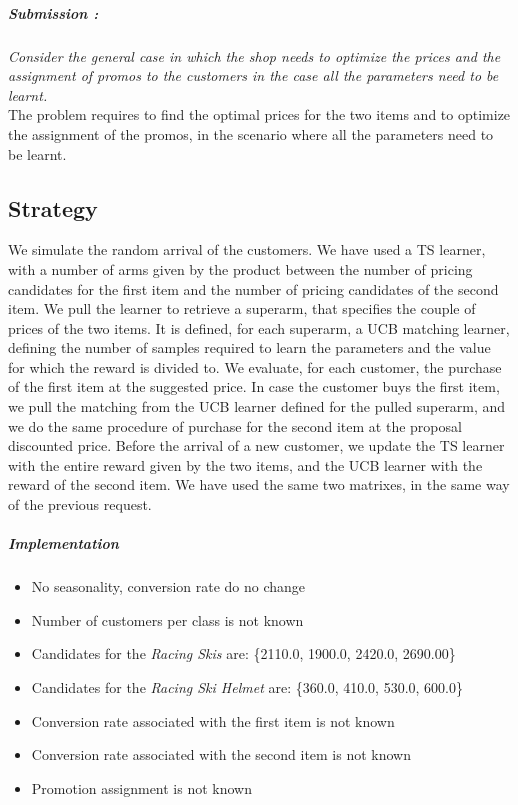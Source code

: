 \subparagraph*{Submission : }
\textit{Consider the general case in which the shop needs to optimize the prices and the assignment of promos to the customers in the case all the parameters need to be learnt.}\\

The problem requires to find the optimal prices for the two items and to optimize the assignment of the promos, in the scenario where all the parameters need to be learnt.

\subsection*{Strategy}
We simulate the random arrival of the customers. We have used a TS learner, with a number of arms given by the product between the number of pricing candidates for the first item and the number of pricing candidates of the second item. We pull the learner to retrieve a superarm, that specifies the couple of prices of the two items. It is defined, for each superarm, a UCB matching learner, defining the number of samples required to learn the parameters and the value for which the reward is divided to. We evaluate, for each customer, the purchase of the first item at the suggested price. In case the customer buys the first item, we pull the matching from the UCB learner defined for the pulled superarm, and we do the same procedure of purchase for the second item at the proposal discounted price. Before the arrival of a new customer, we update the TS learner with the entire reward given by the two items, and the UCB learner with the reward of the second item. We have used the same two matrixes, in the same way of the previous request.

\subparagraph{Implementation} 
\begin{itemize}
	\item No seasonality, conversion rate do no change
	\item Number of customers per class is not known 
	\item Candidates for the \textit{Racing Skis} are: \{2110.0, 1900.0, 2420.0, 2690.00\}
	\item Candidates for the \textit{Racing Ski Helmet} are: \{360.0, 410.0, 530.0, 600.0\}
	\item Conversion rate associated with the first item is not known
	\item Conversion rate associated with the second item is not known
	\item Promotion assignment is not known 
\end{itemize}


